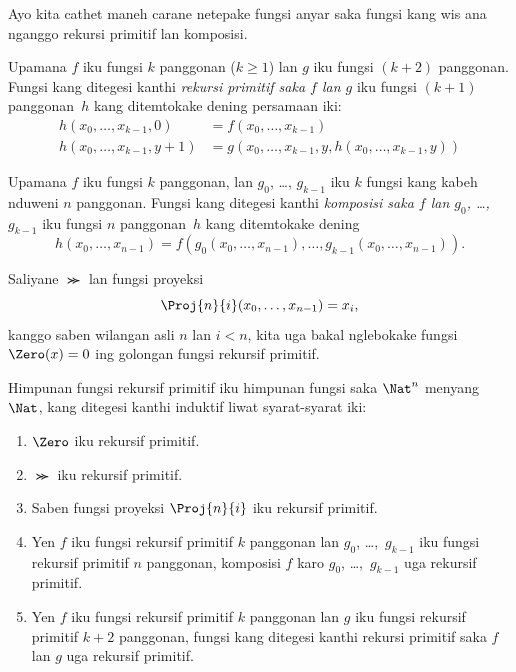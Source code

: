 \documentclass[../../../include/open-logic-section]{subfiles}
\begin{document}

Ayo kita cathet maneh carane netepake fungsi anyar saka fungsi
kang wis ana nganggo rekursi primitif lan komposisi.

\begin{defn}
   Upamana $f$ iku fungsi
  $k$ panggonan ($k\ge 1$) lan $g$ iku fungsi $(k+2)$ panggonan.
  Fungsi kang ditegesi kanthi \emph{rekursi primitif saka $f$ lan $g$}
  iku fungsi $(k+1)$ panggonan~$h$ kang ditemtokake dening
  persamaan iki:
  \begin{align*}
    h(x_0,\dots,x_{k-1},0) & =  f(x_0,\dots,x_{k-1}) \\
    h(x_0,\dots,x_{k-1},y+1) & = g(x_0,\dots,x_{k-1}, y, h(x_0,\dots,x_{k-1}, y))
  \end{align*}
\end{defn}

\begin{defn}
   Upamana $f$ iku fungsi $k$ panggonan,
  lan $g_0$, \dots, $g_{k-1}$ iku $k$ fungsi kang kabeh nduweni
  $n$ panggonan. Fungsi kang ditegesi kanthi \emph{komposisi saka $f$
    lan $g_0$, \dots,~$g_{k-1}$} iku fungsi $n$ panggonan~$h$
  kang ditemtokake dening
  \[
  h(x_0, \dots, x_{n-1}) =
  f(g_0(x_0, \dots, x_{n-1}), \dots, g_{k-1}(x_0, \dots, x_{n-1})).
  \]
\end{defn}

Saliyane $\Succ$ lan fungsi proyeksi
\[
\Proj{n}{i}(x_0,\dots,x_{n-1}) = x_i,
\]
kanggo saben wilangan asli $n$ lan $i < n$, kita uga bakal nglebokake
fungsi~$\Zero(x) = 0$ ing golongan fungsi rekursif primitif.

\begin{defn}
  Himpunan fungsi rekursif primitif iku himpunan fungsi
  saka $\Nat^n$ menyang $\Nat$, kang ditegesi kanthi induktif
  liwat syarat-syarat iki:
  \begin{enumerate}
  \item $\Zero$ iku rekursif primitif.
  \item $\Succ$ iku rekursif primitif.
  \item Saben fungsi proyeksi $\Proj{n}{i}$ iku rekursif primitif.
  \item Yen $f$ iku fungsi rekursif primitif $k$ panggonan lan $g_0$,
    \dots,~$g_{k-1}$ iku fungsi rekursif primitif $n$ panggonan,
    komposisi $f$ karo $g_0$, \dots,~$g_{k-1}$ uga rekursif
    primitif.
  \item Yen $f$ iku fungsi rekursif primitif $k$ panggonan lan $g$ iku
    fungsi rekursif primitif $k+2$ panggonan, fungsi kang ditegesi
    kanthi rekursi primitif saka $f$ lan $g$ uga rekursif
    primitif.
\end{enumerate}
\end{defn}
\end{document}
